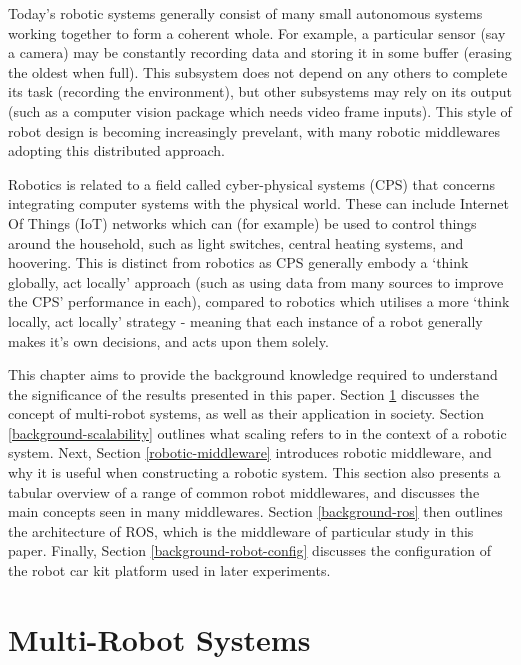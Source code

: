\documentclass[../dissertation.tex]{subfiles}
\begin{document}
Today's robotic systems generally consist of many small autonomous systems working together to form a coherent whole\cite{4058987}. For example, a particular sensor (say a camera) may be constantly recording data and storing it in some buffer (erasing the oldest when full). This subsystem does not depend on any others to complete its task (recording the environment), but other subsystems may rely on its output (such as a computer vision package which needs video frame inputs). This style of robot design is becoming increasingly prevelant, with many robotic middlewares adopting this distributed approach.

Robotics is related to a field called cyber-physical systems (CPS) that concerns integrating computer systems with the physical world\cite{Lee:EECS-2008-8}. These can include Internet Of Things (IoT) networks\cite{atzori2010internet} which can (for example) be used to control things around the household, such as light switches, central heating systems, and hoovering. This is distinct from robotics as CPS generally embody a `think globally, act locally' approach\cite{gordonthink} (such as using data from many sources to improve the CPS' performance in each), compared to robotics which utilises a more `think locally, act locally' strategy - meaning that each instance of a robot generally makes it's own decisions, and acts upon them solely.

This chapter aims to provide the background knowledge required to understand the significance of the results presented in this paper. Section \ref{section-multi-robot-systems} discusses the concept of multi-robot systems, as well as their application in society. Section \ref{background-scalability} outlines what scaling refers to in the context of a robotic system. Next, Section \ref{robotic-middleware} introduces robotic middleware, and why it is useful when constructing a robotic system. This section also presents a tabular overview of a range of common robot middlewares, and discusses the main concepts seen in many middlewares. Section \ref{background-ros} then outlines the architecture of ROS, which is the middleware of particular study in this paper. Finally, Section \ref{background-robot-config} discusses the configuration of the robot car kit platform used in later experiments.

\section{Multi-Robot Systems}
\label{section-multi-robot-systems}
\end{document}

